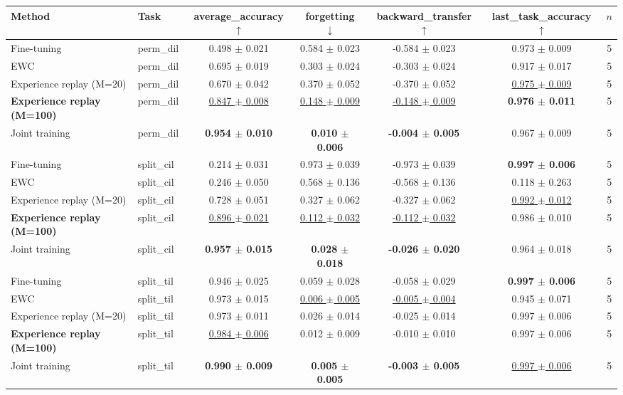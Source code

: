 \begin{tabular}{llccccc}
\toprule
Method & Task & average\_accuracy $\uparrow$ & forgetting $\downarrow$ & backward\_transfer $\uparrow$ & last\_task\_accuracy $\uparrow$ & $n$ \\
\midrule
Fine-tuning & perm\_dil & 0.498 $\pm$ 0.021 & 0.584 $\pm$ 0.023 & -0.584 $\pm$ 0.023 & 0.973 $\pm$ 0.009 & 5 \\
EWC & perm\_dil & 0.695 $\pm$ 0.019 & 0.303 $\pm$ 0.024 & -0.303 $\pm$ 0.024 & 0.917 $\pm$ 0.017 & 5 \\
Experience replay (M=20) & perm\_dil & 0.670 $\pm$ 0.042 & 0.370 $\pm$ 0.052 & -0.370 $\pm$ 0.052 & \underline{0.975 $\pm$ 0.009} & 5 \\
\textbf{Experience replay (M=100)} & perm\_dil & \underline{0.847 $\pm$ 0.008} & \underline{0.148 $\pm$ 0.009} & \underline{-0.148 $\pm$ 0.009} & \textbf{0.976 $\pm$ 0.011} & 5 \\
Joint training & perm\_dil & \textbf{0.954 $\pm$ 0.010} & \textbf{0.010 $\pm$ 0.006} & \textbf{-0.004 $\pm$ 0.005} & 0.967 $\pm$ 0.009 & 5 \\
\midrule
Fine-tuning & split\_cil & 0.214 $\pm$ 0.031 & 0.973 $\pm$ 0.039 & -0.973 $\pm$ 0.039 & \textbf{0.997 $\pm$ 0.006} & 5 \\
EWC & split\_cil & 0.246 $\pm$ 0.050 & 0.568 $\pm$ 0.136 & -0.568 $\pm$ 0.136 & 0.118 $\pm$ 0.263 & 5 \\
Experience replay (M=20) & split\_cil & 0.728 $\pm$ 0.051 & 0.327 $\pm$ 0.062 & -0.327 $\pm$ 0.062 & \underline{0.992 $\pm$ 0.012} & 5 \\
\textbf{Experience replay (M=100)} & split\_cil & \underline{0.896 $\pm$ 0.021} & \underline{0.112 $\pm$ 0.032} & \underline{-0.112 $\pm$ 0.032} & 0.986 $\pm$ 0.010 & 5 \\
Joint training & split\_cil & \textbf{0.957 $\pm$ 0.015} & \textbf{0.028 $\pm$ 0.018} & \textbf{-0.026 $\pm$ 0.020} & 0.964 $\pm$ 0.018 & 5 \\
\midrule
Fine-tuning & split\_til & 0.946 $\pm$ 0.025 & 0.059 $\pm$ 0.028 & -0.058 $\pm$ 0.029 & \textbf{0.997 $\pm$ 0.006} & 5 \\
EWC & split\_til & 0.973 $\pm$ 0.015 & \underline{0.006 $\pm$ 0.005} & \underline{-0.005 $\pm$ 0.004} & 0.945 $\pm$ 0.071 & 5 \\
Experience replay (M=20) & split\_til & 0.973 $\pm$ 0.011 & 0.026 $\pm$ 0.014 & -0.025 $\pm$ 0.014 & 0.997 $\pm$ 0.006 & 5 \\
\textbf{Experience replay (M=100)} & split\_til & \underline{0.984 $\pm$ 0.006} & 0.012 $\pm$ 0.009 & -0.010 $\pm$ 0.010 & 0.997 $\pm$ 0.006 & 5 \\
Joint training & split\_til & \textbf{0.990 $\pm$ 0.009} & \textbf{0.005 $\pm$ 0.005} & \textbf{-0.003 $\pm$ 0.005} & \underline{0.997 $\pm$ 0.006} & 5 \\
\bottomrule
\end{tabular}
